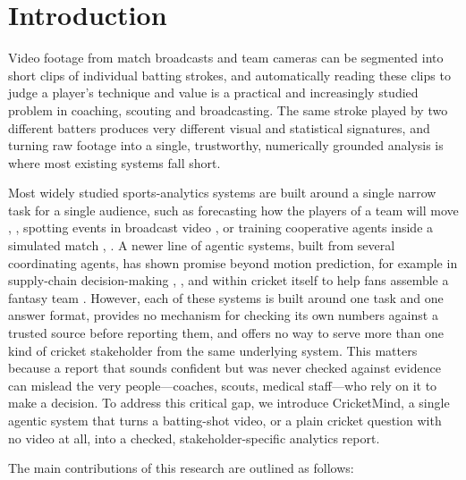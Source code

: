 \section{Introduction}

Video footage from match broadcasts and team cameras can be segmented into short clips of individual batting strokes, and automatically reading these clips to judge a player's technique and value is a practical and increasingly studied problem in coaching, scouting and broadcasting. The same stroke played by two different batters produces very different visual and statistical signatures, and turning raw footage into a single, trustworthy, numerically grounded analysis is where most existing systems fall short.

Most widely studied sports-analytics systems are built around a single narrow task for a single audience, such as forecasting how the players of a team will move \cite{ref1}, \cite{ref2}, spotting events in broadcast video \cite{ref3}, or training cooperative agents inside a simulated match \cite{ref4}, \cite{ref5}. A newer line of agentic systems, built from several coordinating agents, has shown promise beyond motion prediction, for example in supply-chain decision-making \cite{ref6}, \cite{ref7}, and within cricket itself to help fans assemble a fantasy team \cite{ref8}. However, each of these systems is built around one task and one answer format, provides no mechanism for checking its own numbers against a trusted source before reporting them, and offers no way to serve more than one kind of cricket stakeholder from the same underlying system. This matters because a report that sounds confident but was never checked against evidence can mislead the very people---coaches, scouts, medical staff---who rely on it to make a decision. To address this critical gap, we introduce CricketMind, a single agentic system that turns a batting-shot video, or a plain cricket question with no video at all, into a checked, stakeholder-specific analytics report.

The main contributions of this research are outlined as follows:


